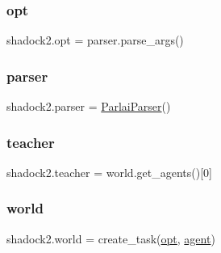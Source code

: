 \mbox{\label{namespaceshadock2_ac16afc5d0983dc9d7e5608d98ef9c8cd}} 
\subsubsection{\texorpdfstring{opt}{opt}}
{\footnotesize\ttfamily shadock2.\+opt = parser.\+parse\+\_\+args()}

\mbox{\label{namespaceshadock2_a89dd1b082837e937b1dacacec493a269}} 
\subsubsection{\texorpdfstring{parser}{parser}}
{\footnotesize\ttfamily shadock2.\+parser = \hyperlink{classparlai_1_1core_1_1params_1_1ParlaiParser}{Parlai\+Parser}()}

\mbox{\label{namespaceshadock2_a8f51abf464ce9479012a1e3b3a64668e}} 
\subsubsection{\texorpdfstring{teacher}{teacher}}
{\footnotesize\ttfamily shadock2.\+teacher = world.\+get\+\_\+agents()\mbox{[}0\mbox{]}}

\mbox{\label{namespaceshadock2_a3165bdff07a55337c2686e7c56b394e4}} 
\subsubsection{\texorpdfstring{world}{world}}
{\footnotesize\ttfamily shadock2.\+world = create\+\_\+task(\hyperlink{namespaceshadock2_ac16afc5d0983dc9d7e5608d98ef9c8cd}{opt}, \hyperlink{namespaceshadock2_a143910b54855edb0a70ffc547d2eb8d7}{agent})}


